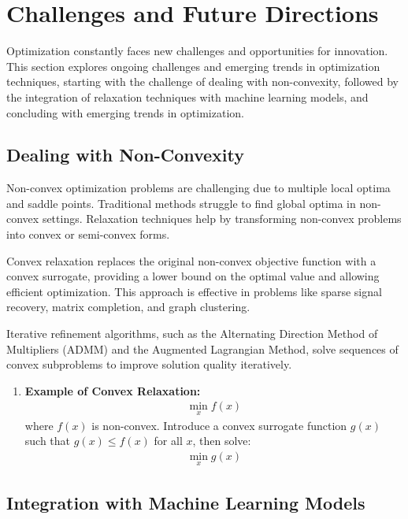 \documentclass[12pt]{book} %
\begin{document}
\section{Challenges and Future Directions}

Optimization constantly faces new challenges and opportunities for innovation. This section explores ongoing challenges and emerging trends in optimization techniques, starting with the challenge of dealing with non-convexity, followed by the integration of relaxation techniques with machine learning models, and concluding with emerging trends in optimization.

\subsection{Dealing with Non-Convexity}

Non-convex optimization problems are challenging due to multiple local optima and saddle points. Traditional methods struggle to find global optima in non-convex settings. Relaxation techniques help by transforming non-convex problems into convex or semi-convex forms.

Convex relaxation replaces the original non-convex objective function with a convex surrogate, providing a lower bound on the optimal value and allowing efficient optimization. This approach is effective in problems like sparse signal recovery, matrix completion, and graph clustering.

Iterative refinement algorithms, such as the Alternating Direction Method of Multipliers (ADMM) and the Augmented Lagrangian Method, solve sequences of convex subproblems to improve solution quality iteratively.

\begin{enumerate}
    \item \textbf{Example of Convex Relaxation:}
    \begin{align*}
        \min_{x} f(x)
    \end{align*}
    where \(f(x)\) is non-convex. Introduce a convex surrogate function \(g(x)\) such that \(g(x) \leq f(x)\) for all \(x\), then solve:
    \begin{align*}
        \min_{x} g(x)
    \end{align*}
\end{enumerate}

\subsection{Integration with Machine Learning Models}
\end{document}
